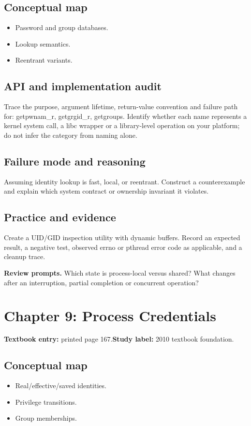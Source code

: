 \documentclass[11pt,letterpaper,oneside]{report}
\begin{document}
\subsection{Conceptual map}
\begin{itemize}
\item Password and group databases.
\item Lookup semantics.
\item Reentrant variants.
\end{itemize}
\subsection{API and implementation audit}
Trace the purpose, argument lifetime, return-value convention and failure path for: getpwnam\_r, getgrgid\_r, getgroups. Identify whether each name represents a kernel system call, a libc wrapper or a library-level operation on your platform; do not infer the category from naming alone.

\subsection{Failure mode and reasoning}
Assuming identity lookup is fast, local, or reentrant. Construct a counterexample and explain which system contract or ownership invariant it violates.

\subsection{Practice and evidence}
Create a UID/GID inspection utility with dynamic buffers. Record an expected result, a negative test, observed errno or pthread error code as applicable, and a cleanup trace.

\textbf{Review prompts.} Which state is process-local versus shared? What changes after an interruption, partial completion or concurrent operation?

\section{Chapter 9: Process Credentials}
\textbf{Textbook entry:} printed page 167.\quad \textbf{Study label:} 2010 textbook foundation.

\subsection{Conceptual map}
\begin{itemize}
\item Real/effective/saved identities.
\item Privilege transitions.
\item Group memberships.
\end{itemize}
\end{document}
